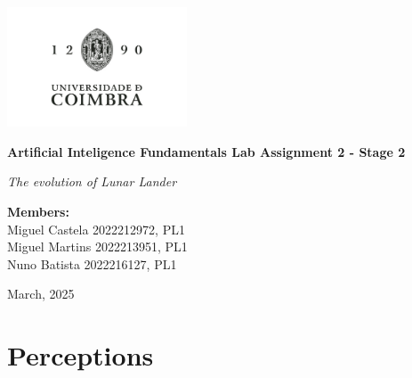 \documentclass[a4paper, 12pt, fleqn]{report}
\begin{document}
\begin{titlepage}
    \centering
    \vspace*{1cm}
    \includegraphics[width=0.4\textwidth]{uc_logo.jpg}

    {\Huge\bfseries Artificial Inteligence Fundamentals Lab Assignment 2 - Stage 2\par}
    \vspace{0.1cm}
    {\Large\itshape The evolution of Lunar Lander \par}
    \vfill
    \vfill
        \begin{center}
            \large
            \textbf{Members: \\}
            Miguel Castela 2022212972, PL1\\
            Miguel Martins 2022213951, PL1\\
            Nuno Batista 2022216127, PL1
    \end{center}
    
    \vfill
    
    {\large March, 2025 \par}
\end{titlepage}

\renewcommand{\contentsname}{Table of Contents}
\tableofcontents
\newpage

\section*{\fontsize{16}{20}\selectfont Perceptions}
\end{document}
